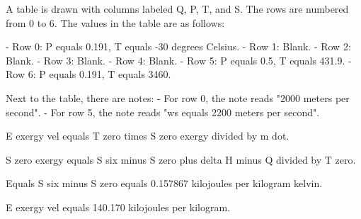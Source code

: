 A table is drawn with columns labeled Q, P, T, and S. The rows are numbered from 0 to 6. The values in the table are as follows:

- Row 0: P equals 0.191, T equals -30 degrees Celsius.
- Row 1: Blank.
- Row 2: Blank.
- Row 3: Blank.
- Row 4: Blank.
- Row 5: P equals 0.5, T equals 431.9.
- Row 6: P equals 0.191, T equals 3460.

Next to the table, there are notes:
- For row 0, the note reads "2000 meters per second".
- For row 5, the note reads "ws equals 2200 meters per second".

E exergy vel equals T zero times S zero exergy divided by m dot.

S zero exergy equals S six minus S zero plus delta H minus Q divided by T zero.

Equals S six minus S zero equals 0.157867 kilojoules per kilogram kelvin.

E exergy vel equals 140.170 kilojoules per kilogram.